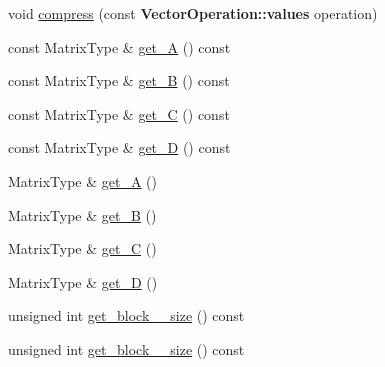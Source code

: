 \begin{DoxyCompactItemize}
\item 
void \hyperlink{class_two_block_matrix_a8de26ebbb410811059d162fb164cedce}{compress} (const {\bf Vector\+Operation\+::values} operation)
\item 
const Matrix\+Type \& \hyperlink{class_two_block_matrix_a304eac57c72f23cbcf18a04e5bc64508}{get\+\_\+A} () const 
\item 
const Matrix\+Type \& \hyperlink{class_two_block_matrix_ab3807e975c3a5de9779a80c8d61fad96}{get\+\_\+B} () const 
\item 
const Matrix\+Type \& \hyperlink{class_two_block_matrix_ac0b0e0bc16412dfd73a8c6a3f782b8d9}{get\+\_\+C} () const 
\item 
const Matrix\+Type \& \hyperlink{class_two_block_matrix_af905a0e4b0504e45937a06df768a2ae2}{get\+\_\+D} () const 
\item 
Matrix\+Type \& \hyperlink{class_two_block_matrix_ab30f0e3b8f803456c3a2f1ce4f753081}{get\+\_\+A} ()
\item 
Matrix\+Type \& \hyperlink{class_two_block_matrix_ae41ca5bbc0495c8ffb1604da488a33b7}{get\+\_\+B} ()
\item 
Matrix\+Type \& \hyperlink{class_two_block_matrix_aeaa4102bb137700d7bbe0262ee16e8ee}{get\+\_\+C} ()
\item 
Matrix\+Type \& \hyperlink{class_two_block_matrix_a3725800849e26e2192c0ac6520777dab}{get\+\_\+D} ()
\item 
unsigned int \hyperlink{class_two_block_matrix_a688b1a69284ec154c493a99ec7cad704}{get\+\_\+block\+\_\+\_\+size} () const 
\item 
unsigned int \hyperlink{class_two_block_matrix_a9ecb16be5aa5ebbb916d256a9ded7c3e}{get\+\_\+block\+\_\+\_\+size} () const 
\end{DoxyCompactItemize}
